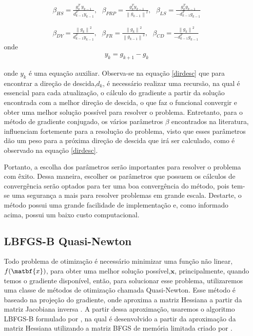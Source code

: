 \begin{eqnarray}
          \nonumber
          \beta_{HS} = \frac{g_{k}^{T}~y_{k-1}}{d^{T}_{k-1} y_{k-1}}, ~~~ \beta_{PRP} = \frac{g_{k}^{T} y_{k-1}}{\left\|g_{k-1}\right\|^{2}}, ~~~\beta_{LS} = \frac{g_{k}^{T} y_{k-1}}{-d_{k-1}^{T} g_{k-1} } \\ \nonumber
          \\ \nonumber \\ \nonumber
          \beta_{DY} = \frac{\left \| g_{k} \right \|^{2}}{d^{T}_{k-1} y_{k-1}}, ~~~\beta_{FR} = \frac{\left \| g_{k}\right \|^{2}}{\left \| g_{k-1}\right \|^{2}},~~~ \beta_{CD} = \frac{\left \| g_{k}\right \|^{2}}{-d_{k-1}^{T} g_{k-1} }
          \end{eqnarray}
onde
\begin{eqnarray}
 \nonumber
y_{k} = g_{k+1} - g_{k}
\end{eqnarray}

onde $y_{k}$ é uma equação auxiliar. Observa-se na equação \ref{dirdesc} que para encontrar a direção de descida,$d_{k}$, é necessário realizar uma recursão, na qual é essencial para cada atualização, o cálculo do gradiente a partir da solução encontrada com a melhor direção de descida, o que faz o funcional convergir e obter uma melhor solução possível para resolver o    problema. Entretanto, para o método de gradiente conjugado, os vários parâmetros $\beta$ encontrados na literatura, influenciam fortemente para a resolução do problema, visto que esses parâmetros dão um peso para a próxima direção de descida que irá ser calculado, como é observado na equação \ref{dirdesc}. 

Portanto, a escolha dos parâmetros serão importantes para resolver o problema com êxito. Dessa maneira, escolher os parâmetros que possuem os cálculos de convergência serão optados para ter uma boa convergência do método, pois tem-se uma segurança a mais para resolver problemas em grande escala. Destarte, o método possui uma grande facilidade de implementação e, como informado acima, possui um baixo custo computacional. 

\newpage
\subsection{LBFGS-B Quasi-Newton}
Todo problema de otimização é necessário minimizar uma função não linear,$f(\matbf{x})$, para obter uma melhor solução possível,$\mathbf{x}$, principalmente, quando temos o gradiente disponível, então, para solucionar esse problema, utilizaremos uma classe de métodos de otimização chamada Quasi-Newton. Esse método é baseado na projeção do gradiente, onde aproxima a matriz Hessiana a partir da matriz Jacobiana inversa \citep{byrd_representations_1994,al-baali_broydens_2013}. A partir dessa aproximação, usaremos o algoritmo LBFGS-B formulado por \citet{zhu_algorithm_1997}, na qual é desenvolvido a partir da aproximação da matriz Hessiana utilizando a matriz BFGS de memória limitada criado por \citet{nocedal_1980}. \\

